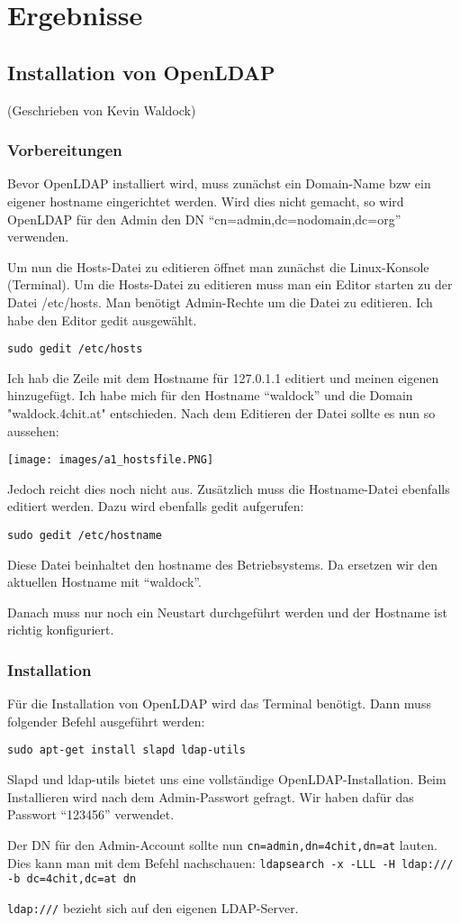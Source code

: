 
\section{Ergebnisse}
\label{sec:Ergebnisse}

\subsection{Installation von OpenLDAP}
(Geschrieben von Kevin Waldock)

\subsubsection{Vorbereitungen}
Bevor OpenLDAP installiert wird, muss zunächst ein Domain-Name bzw ein eigener hostname eingerichtet werden. Wird dies nicht gemacht, so wird OpenLDAP für den Admin den DN ``cn=admin,dc=nodomain,dc=org'' verwenden.

Um nun die Hosts-Datei zu editieren öffnet man zunächst die Linux-Konsole (Terminal). Um die Hosts-Datei zu editieren muss man ein Editor starten zu der Datei /etc/hosts. Man benötigt Admin-Rechte um die Datei zu editieren. Ich habe den Editor gedit ausgewählt.

\verb|sudo gedit /etc/hosts|

Ich hab die Zeile mit dem Hostname für 127.0.1.1 editiert und meinen eigenen hinzugefügt. Ich habe mich für den Hostname ``waldock'' und die Domain "waldock.4chit.at" entschieden. Nach dem Editieren der Datei sollte es nun so aussehen:

\begin{center}
	\texttt{[image: images/a1\_hostsfile.PNG]}
\end{center}

Jedoch reicht dies noch nicht aus. Zusätzlich muss die Hostname-Datei ebenfalls editiert werden. Dazu wird ebenfalls gedit aufgerufen:

\verb|sudo gedit /etc/hostname|

Diese Datei beinhaltet den hostname des Betriebsystems. Da ersetzen wir den aktuellen Hostname mit ``waldock''.

Danach muss nur noch ein Neustart durchgeführt werden und der Hostname ist richtig konfiguriert.

\subsubsection{Installation}
Für die Installation von OpenLDAP wird das Terminal benötigt. Dann muss folgender Befehl ausgeführt werden:

\verb|sudo apt-get install slapd ldap-utils|

Slapd und ldap-utils bietet uns eine vollständige OpenLDAP-Installation. Beim Installieren wird nach dem Admin-Passwort gefragt. Wir haben dafür das Passwort ``123456'' verwendet.

Der DN für den Admin-Account sollte nun \verb|cn=admin,dn=4chit,dn=at| lauten.
Dies kann man mit dem Befehl nachschauen:
\verb|ldapsearch -x -LLL -H ldap:/// -b dc=4chit,dc=at dn|

\verb|ldap:///| bezieht sich auf den eigenen LDAP-Server.

